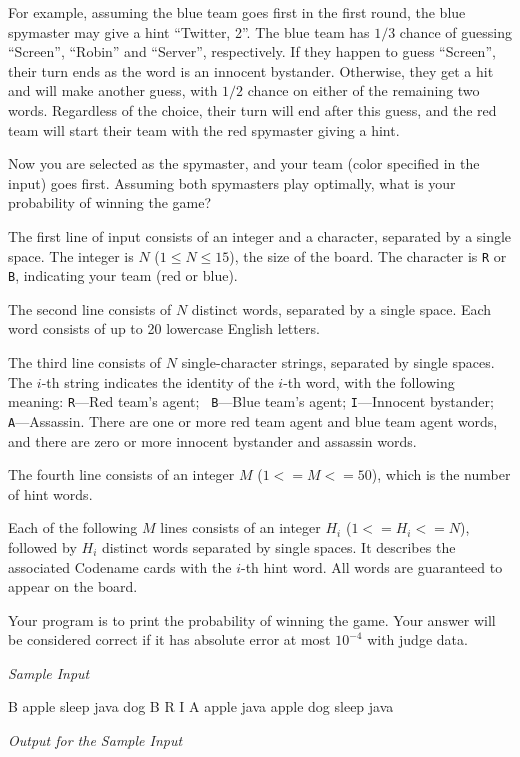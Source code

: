 \par
For example, assuming the blue team goes first in the first round,
the blue spymaster may give a hint ``Twitter, 2''. The blue team has
$1/3$ chance of guessing ``Screen'', ``Robin'' and ``Server'',
respectively. If they happen to guess ``Screen'', their turn ends as
the word is an innocent bystander. Otherwise, they get a hit and will
make another guess, with $1/2$ chance on either of the remaining two
words. Regardless of the choice, their turn will end after this
guess, and the red team will start their team with the red spymaster
giving a hint.
\par
Now you are selected as the spymaster, and your team (color specified
in the input) goes first. Assuming both spymasters play optimally,
what is your probability of winning the game?
\par
The first line of input consists of an integer and a character,
separated by a single space. The integer is $N$ ($1 \le N \le 15$),
the size of the board. The character is {\tt R} or {\tt B},
indicating your team (red or blue).
\par
The second line consists of $N$ distinct words, separated by a single
space. Each word consists of up to 20 lowercase English letters.
\par
The third line consists of $N$ single-character strings, separated by
single spaces. The $i$-th string indicates the identity of the $i$-th
word, with the following meaning: {\tt R}---Red team's agent; {\tt
B}---Blue team's agent; {\tt I}---Innocent bystander; {\tt
A}---Assassin. There are one or more red team agent and blue team
agent words, and there are zero or more innocent bystander and
assassin words.
\par
The fourth line consists of an integer $M$ ($1 <= M <= 50$), which is
the number of hint words.
\par
Each of the following $M$ lines consists of an integer $H_i$ ($1 <=
H_i <= N$), followed by $H_i$ distinct words separated by single
spaces. It describes the associated Codename cards with the $i$-th
hint word. All words are guaranteed to appear on the board.
\par
Your program is to print the probability of winning the game. Your answer
will be considered correct if it has absolute error at most $10^{-4}$ with
judge data.
\vskip 22pt
\centerline {\it Sample Input}
\vskip 14pt
 B
\:apple sleep java dog
\:B R I A
 apple java
 apple dog
 sleep java
\vskip 22pt
\centerline{\it Output for the Sample Input}
\vskip 14pt

